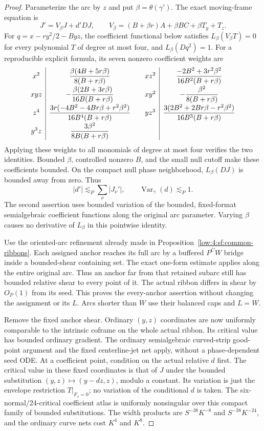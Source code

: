 \documentclass[11pt]{amsart}
\theoremstyle{definition}
\theoremstyle{remark}
\numberwithin{equation}{section}
\begin{document}
\begin{proof}
Parameterize the arc by $z$ and put $\beta=\theta(\gamma')$. The exact moving-frame equation is
\[
J'=V_\beta J+d'DJ,\qquad
V_\beta=(B+\beta r)A+\beta BC+\beta T_y+T_z.
\]
For $q=x-r y^2/2-Byz$, the coefficient functional below satisfies $L_\beta(V_\beta T)=0$ for every polynomial $T$ of degree at most four, and $L_\beta(Dq^2)=1$. For a reproducible explicit formula, its seven nonzero coefficient weights are
\[
\begin{array}{c|c@{\qquad}c|c}
x^2&\dfrac{\beta(4B+5r\beta)}{8(B+r\beta)}
 &xz^2&\dfrac{-2B^2+3r^2\beta^2}{16B^2(B+r\beta)}\\[7pt]
xyz&-\dfrac{\beta(2B+3r\beta)}{16B(B+r\beta)}
 &xy^2&-\dfrac{\beta^2}{8(B+r\beta)}\\[7pt]
z^4&\dfrac{3r(-4B^2-4Br\beta+r^2\beta^2)}{16B^4(B+r\beta)}
 &yz^3&\dfrac{3(2B^2+2Br\beta-r^2\beta^2)}{16B^3(B+r\beta)}\\[7pt]
y^3z&\dfrac{3\beta^2}{8B(B+r\beta)}&&
\end{array}
\]
Applying these weights to all monomials of degree at most four verifies the two identities. Bounded $\beta$, controlled nonzero $B$, and the small null cutoff make these coefficients bounded. On the compact null phase neighborhood, $L_\beta(DJ)$ is bounded away from zero. Thus
\[
|d'|\lesssim_P\sum_{\nu}|J_\nu'|,
\qquad \operatorname{Var}_\gamma(d)\lesssim_P1.
\]
The second assertion uses bounded variation of the bounded, fixed-format semialgebraic coefficient functions along the original arc parameter. Varying $\beta$ causes no derivative of $L_\beta$ in this pointwise identity.

Use the oriented-arc refinement already made in Proposition~\ref{low:4:sf:common-ribbons}. Each assigned anchor reaches its full arc by a buffered $P^CW$ bridge inside a bounded-shear containing set. The exact one-form estimate applies along the entire original arc. Thus an anchor far from that retained subarc still has bounded relative shear to every point of it. The actual ribbon differs in shear by $O_P(1)$ from its seed. This proves the every-anchor assertion without changing the assignment or its $L$. Arcs shorter than $W$ use their balanced caps and $L=W$.

Remove the fixed anchor shear. Ordinary $(y,z)$ coordinates are now uniformly comparable to the intrinsic coframe on the whole actual ribbon. Its critical value has bounded ordinary gradient. The ordinary semialgebraic curved-strip good-point argument and the fixed centerline-jet net apply, without a phase-dependent seed ODE. At a coefficient point, condition on the actual relative $d$ first. The critical value in these fixed coordinates is that of $J$ under the bounded substitution $(y,z)\mapsto(y-dz,z)$, modulo a constant. Its variation is just the envelope restriction $T|_{F_x=0}$; no variation of the conditional $d$ is taken. The six-normal/24-critical coefficient atlas is uniformly nonsingular over this compact family of bounded substitutions. The width products are $S^{-38}K^{-8}$ and $S^{-38}K^{-24}$, and the ordinary curve nets cost $K^4$ and $K^8$.


\end{proof}
\end{document}
